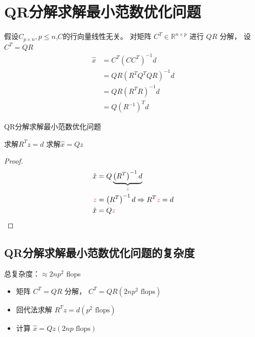 \section{QR分解求解最小范数优化问题}
假设$C_{p \times n}, p \le n$,$C$的行向量线性无关。
对矩阵 $ C^{T} \in \mathbb{R}^{n \times p} $ 进行 $ Q R $ 分解， 设$ C^{T}=Q R $
\begin{equation}
\begin{aligned}
\hat{x} &=C^{T}\left(C C^{T}\right)^{-1} d \\
&=Q R\left(R^{T} Q^{T} Q R\right)^{-1} d \\
&=Q R\left(R^{T} R\right)^{-1} d \\
&=Q \left(R^{-1}\right)^T d
\end{aligned}
\end{equation}

\begin{algorithm}[htbp]
    \caption{QR分解求解最小范数优化问题}
    求解$R^T z=d$ \;
    求解$\hat{x} = Qz$\;
    
\end{algorithm}

\begin{proof}
    \begin{equation}\displaystyle \begin{aligned}
    \hat{x} & =Q\underbrace{\left( R^{T}\right)^{-1} d}_{\textcolor[rgb]{0.72,0.33,0.31}{z}}\\
    \textcolor[rgb]{0.72,0.33,0.31}{z} & =\left( R^{T}\right)^{-1} d\Rightarrow R^{T}\textcolor[rgb]{0.72,0.33,0.31}{z} =d\\
    \hat{x} & =Q\textcolor[rgb]{0.72,0.33,0.31}{z}
    \end{aligned}\end{equation}
\end{proof}


\subsection{QR分解求解最小范数优化问题的复杂度}
\label{complexity:qr-solves-min-norm}

总复杂度：$ \approx 2 n p^{2} $ flops

\begin{itemize}
    \item 矩阵 $ C^{T}=Q R $ 分解， $ C^{T}=Q R\left(2 n p^{2}  \text{ flops}\right) $
    \item 回代法求解 $ R^{T} z=d\left(p^{2} \text{ flops} \right) $
    \item 计算 $ \hat{x}=Q z(2 n p \text{ flops} ) $
\end{itemize}



